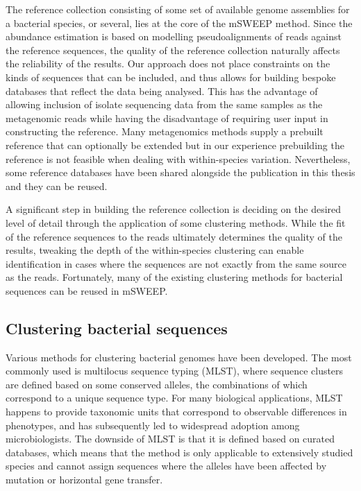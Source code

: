 \documentclass[officiallayout]{tktla}
\begin{document}
The reference collection consisting of some set of available genome
assemblies for a bacterial species, or several, lies at the core of
the mSWEEP method. Since the abundance estimation is based on
modelling pseudoalignments of reads against the reference sequences,
the quality of the reference collection naturally affects the
reliability of the results. Our approach does not place constraints on
the kinds of sequences that can be included, and thus allows for
building bespoke databases that reflect the data being analysed. This
has the advantage of allowing inclusion of isolate sequencing data
from the same samples as the metagenomic reads while having the
disadvantage of requiring user input in constructing the
reference. Many metagenomics methods supply a prebuilt reference that
can optionally be extended but in our experience prebuilding the
reference is not feasible when dealing with within-species
variation. Nevertheless, some reference databases have been shared
alongside the publication in this thesis and they can be reused.

A significant step in building the reference collection is deciding on
the desired level of detail through the application of some clustering
methods. While the fit of the reference sequences to the reads
ultimately determines the quality of the results, tweaking the depth
of the within-species clustering can enable identification in cases
where the sequences are not exactly from the same source as the
reads. Fortunately, many of the existing clustering methods for
bacterial sequences can be reused in mSWEEP.

\subsection{Clustering bacterial sequences}

Various methods for clustering bacterial genomes have been
developed. The most commonly used is multilocus sequence typing
(MLST), where sequence clusters are defined based on some conserved
alleles, the combinations of which correspond to a unique sequence
type. For many biological applications, MLST happens to provide
taxonomic units that correspond to observable differences in
phenotypes, and has subsequently led to widespread adoption among
microbiologists. The downside of MLST is that it is defined based on
curated databases, which means that the method is only applicable to
extensively studied species and cannot assign sequences where the
alleles have been affected by mutation or horizontal gene transfer.
\end{document}
